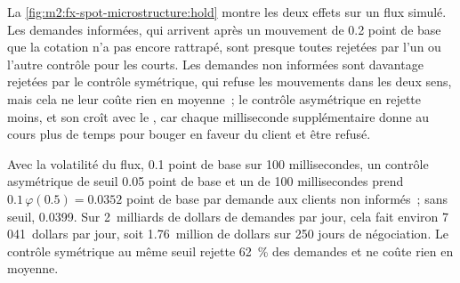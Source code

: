\begin{omfigure}
\label{fig:m2:fx-spot-microstructure:hold}
\end{omfigure}

La \cref{fig:m2:fx-spot-microstructure:hold} montre les deux effets sur un flux simulé. Les demandes
informées, qui arrivent après un mouvement de 0.2 point de base que la cotation n'a pas
encore rattrapé, sont presque toutes rejetées par l'un ou l'autre contrôle pour les  courts. Les demandes non informées sont davantage rejetées par le contrôle
symétrique, qui refuse les mouvements dans les deux sens, mais cela ne leur coûte rien en
moyenne~; le contrôle asymétrique en rejette moins, et son  croît avec le , car chaque milliseconde supplémentaire donne au cours plus de temps pour bouger
en faveur du client et être refusé.

\begin{example}\label{ex:m2:fx-spot-microstructure:window}
Avec la volatilité du flux, 0.1 point de base sur 100 millisecondes, un contrôle
asymétrique de seuil 0.05 point de base et un  de 100 millisecondes
prend $0.1\,\varphi(0.5) = 0.0352$ point de base par demande aux clients non informés~; sans
seuil, 0.0399. Sur 2~milliards de dollars de demandes par jour, cela fait
environ 7\,041~dollars par jour, soit 1.76~million de dollars sur 250 jours de négociation. Le
contrôle symétrique au même seuil rejette 62~\% des demandes et ne coûte rien en
moyenne.
\end{example}

